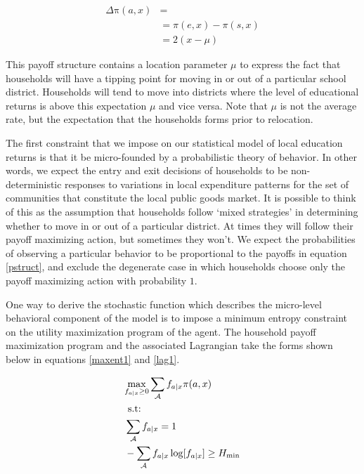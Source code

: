 \begin{equation} \label{paydiff}
\begin{aligned}
\Delta \mathrm{\pi}(a, x) &= \\
&= \pi(e,x)  - \pi(s,x) \\
&= 2(x-\mu) 
\end{aligned}
\end{equation}

\medskip 

This payoff structure contains a location parameter $\mu$ to express
the fact that households will have a tipping point for moving in or
out of a particular school district. Households will tend to move into
districts where the level of educational returns is above this
expectation $\mu$ and vice versa.  Note that $\mu$ is not the average
rate, but the expectation that the households forms prior to relocation.


The first constraint that we impose on our statistical model of local
education returns is that it be micro-founded by a probabilistic
theory of behavior. In other words, we expect the entry and exit
decisions of households to be non-deterministic responses to
variations in local expenditure patterns for the set of communities
that constitute the local public goods market. It is possible to think
of this as the assumption that households follow `mixed strategies' in
determining whether to move in or out of a particular district. At
times they will follow their payoff maximizing action, but sometimes
they won't. We expect the probabilities of observing a particular
behavior to be proportional to the payoffs in equation \ref{pstruct},
and exclude the degenerate case in which households choose only the
payoff maximizing action with probability $1$.

One way to derive the stochastic function which describes the
micro-level behavioral component of the model is to impose a minimum
entropy constraint on the utility maximization program of the
agent. The household payoff maximization program and the associated
Lagrangian take the forms shown below in equations \ref{maxent1} and
\ref{lag1}.

\medskip

\begin{equation} \label{maxent1}
\begin{aligned}
&\underset{f_{a| x}\geq 0}{\max} \space \sum_{\mathcal{A}} f_{a \mid x} \space
\pi(a,x) \\ &\text { s.t: } \\ & \sum_{\mathcal{A}} f_{a \mid x}=1
\\ &-\sum_{\mathcal{A}} f_{a \mid x} \log [f_{a \mid x}] \geq \space
H_{\operatorname{min}} \end{aligned} 
\end{equation}


